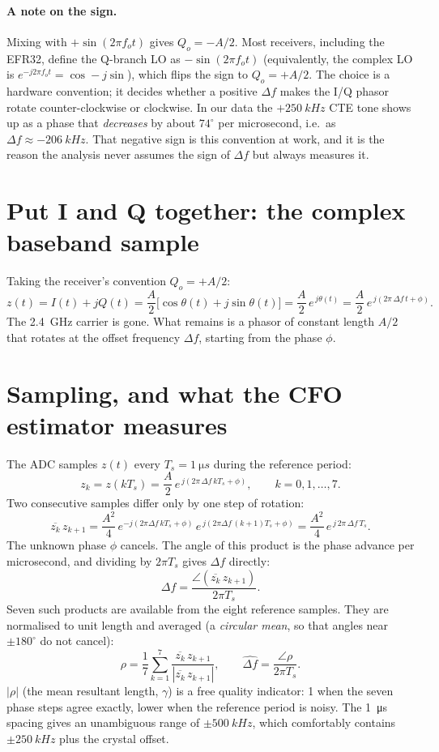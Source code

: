 \documentclass[11pt,a4paper]{article}
\begin{document}
\paragraph{A note on the sign.}
Mixing with $+\sin(2\pi f_o t)$ gives $Q_o = -A/2$. Most receivers, including the EFR32, define the Q-branch LO as $-\sin(2\pi f_o t)$ (equivalently, the complex LO is $e^{-j2\pi f_o t} = \cos - j\sin$), which flips the sign to $Q_o = +A/2$. The choice is a hardware convention; it decides whether a positive $\Delta f$ makes the I/Q phasor rotate counter-clockwise or clockwise. In our data the $+\SI{250}{kHz}$ CTE tone shows up as a phase that \emph{decreases} by about $74^\circ$ per microsecond, i.e.\ as $\Delta f \approx -\SI{206}{kHz}$. That negative sign is this convention at work, and it is the reason the analysis never assumes the sign of $\Delta f$ but always measures it.

\section{Put I and Q together: the complex baseband sample}
Taking the receiver's convention $Q_o = +A/2$:
\[
  z(t) = I(t) + jQ(t)
        = \frac{A}{2}\Big[\cos\theta(t) + j\sin\theta(t)\Big]
        = \frac{A}{2}\,e^{\,j\theta(t)}
        = \frac{A}{2}\,e^{\,j\left(2\pi\,\Delta f\,t + \phi\right)} .
\]
The \SI{2.4}{GHz} carrier is gone. What remains is a phasor of constant length $A/2$ that rotates at the offset frequency $\Delta f$, starting from the phase $\phi$.

\section{Sampling, and what the CFO estimator measures}
The ADC samples $z(t)$ every $T_s = \SI{1}{\micro s}$ during the reference period:
\[
  z_k = z(kT_s) = \frac{A}{2}\,e^{\,j\left(2\pi\,\Delta f\,kT_s + \phi\right)},
  \qquad k = 0,1,\dots,7 .
\]
Two consecutive samples differ only by one step of rotation:
\[
  \overline{z_k}\,z_{k+1}
  = \frac{A^2}{4}\,e^{-j(2\pi\Delta f\,kT_s+\phi)}\,e^{\,j(2\pi\Delta f\,(k+1)T_s+\phi)}
  = \frac{A^2}{4}\,e^{\,j\,2\pi\,\Delta f\,T_s}.
\]
The unknown phase $\phi$ cancels. The angle of this product is the phase advance per microsecond, and dividing by $2\pi T_s$ gives $\Delta f$ directly:
\[
  \Delta f = \frac{\angle\!\left(\overline{z_k}\,z_{k+1}\right)}{2\pi T_s}.
\]
Seven such products are available from the eight reference samples. They are normalised to unit length and averaged (a \emph{circular mean}, so that angles near $\pm180^\circ$ do not cancel):
\[
  \rho = \frac{1}{7}\sum_{k=1}^{7}\frac{\overline{z_k}\, z_{k+1}}{|\overline{z_k}\, z_{k+1}|},
  \qquad \hat{\Delta f} = \frac{\angle\rho}{2\pi T_s}.
\]
$|\rho|$ (the mean resultant length, $\gamma$) is a free quality indicator: 1 when the seven phase steps agree exactly, lower when the reference period is noisy. The \SI{1}{\micro s} spacing gives an unambiguous range of $\pm\SI{500}{kHz}$, which comfortably contains $\pm\SI{250}{kHz}$ plus the crystal offset.
\end{document}
